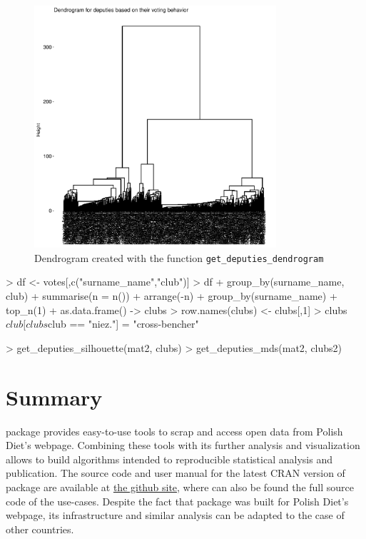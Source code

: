 \begin{figure}[htbp]
  \centering
  \includegraphics[width=0.8\textwidth]{ggdendro01}
  \caption{Dendrogram created with the function \texttt{get\_deputies\_dendrogram}}
  \label{figure:ggdendro}
\end{figure}


\begin{example}
> df <- votes[,c("surname_name","club")]
> df %
+   group_by(surname_name, club) %
+   summarise(n = n()) %
+   arrange(-n) %
+   group_by(surname_name) %
+   top_n(1) %
+   as.data.frame() -> clubs
> row.names(clubs) <- clubs[,1]
> clubs$club[clubs$club == "niez."] = "cross-bencher"

> get_deputies_silhouette(mat2, clubs)
> get_deputies_mds(mat2, clubs2)

\end{example}


\section{Summary}

 package provides easy-to-use tools to scrap and access open data from Polish Diet's webpage. Combining these tools with its further analysis and visualization
allows to build algorithms intended to reproducible statistical analysis and publication. The source code and user manual for the latest CRAN version of  package are available at \href{https://github.com/mi2-warsaw/sejmRP}{the github site}, where can also be found the full source code of the use-cases. Despite the fact that  package was built for Polish Diet's webpage, its infrastructure and similar analysis can be adapted to the case of other countries.

